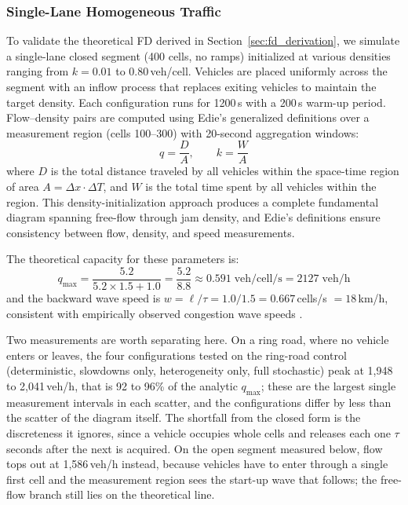 \documentclass[review,number]{elsarticle}
\begin{document}
\subsubsection{Single-Lane Homogeneous Traffic}

To validate the theoretical FD derived in Section~\ref{sec:fd_derivation}, we simulate a single-lane closed segment (400 cells, no ramps) initialized at various densities ranging from $k = 0.01$ to $0.80$\,veh/cell. Vehicles are placed uniformly across the segment with an inflow process that replaces exiting vehicles to maintain the target density. Each configuration runs for 1200\,s with a 200\,s warm-up period. Flow--density pairs are computed using Edie's generalized definitions \citep{edie1963discussion} over a measurement region (cells 100--300) with 20-second aggregation windows:
\begin{equation}
    q = \frac{D}{A}, \qquad k = \frac{W}{A}
    \label{eq:fd_measurement}
\end{equation}
where $D$ is the total distance traveled by all vehicles within the space-time region of area $A = \Delta x \cdot \Delta T$, and $W$ is the total time spent by all vehicles within the region. This density-initialization approach produces a complete fundamental diagram spanning free-flow through jam density, and Edie's definitions ensure consistency between flow, density, and speed measurements.

The theoretical capacity for these parameters is:
\begin{equation}
    q_{\max} = \frac{5.2}{5.2 \times 1.5 + 1.0} = \frac{5.2}{8.8} \approx 0.591\;\text{veh/cell/s} = 2127\;\text{veh/h}
\end{equation}
and the backward wave speed is $w = \ell/\tau = 1.0/1.5 = 0.667$\,cells/s $= 18$\,km/h, consistent with empirically observed congestion wave speeds \citep{cassidy1998bivariate}.

Two measurements are worth separating here. On a ring road, where no vehicle enters or leaves, the four configurations tested on the ring-road control (deterministic, slowdowns only, heterogeneity only, full stochastic) peak at 1{,}948 to 2{,}041\,veh/h, that is 92 to 96\% of the analytic $q_{\max}$; these are the largest single measurement intervals in each scatter, and the configurations differ by less than the scatter of the diagram itself. The shortfall from the closed form is the discreteness it ignores, since a vehicle occupies whole cells and releases each one $\tau$ seconds after the next is acquired. On the open segment measured below, flow tops out at 1{,}586\,veh/h instead, because vehicles have to enter through a single first cell and the measurement region sees the start-up wave that follows; the free-flow branch still lies on the theoretical line.
\end{document}
